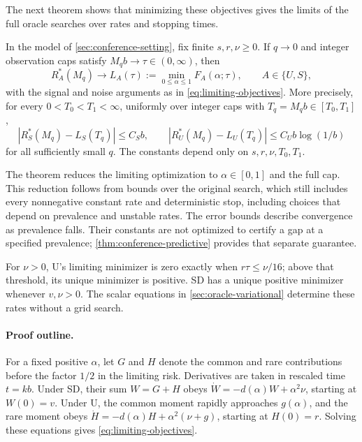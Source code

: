 \documentclass{alt2027}
\begin{document}
The next theorem shows that minimizing these objectives gives the limits of the
full oracle searches over rates and stopping times.

\begin{theorem}
  \label{thm:oracle-limits}
  In the model of \cref{sec:conference-setting}, fix finite $s,r,\nu \geq 0$. If
  $q \to 0$ and integer observation caps satisfy $M_qb \to \tau \in (0,\infty)$,
  then
  \[
    R_A^*(M_q)
    \longrightarrow L_A(\tau)
    :=              \min_{0 \leq \alpha \leq 1}F_A(\alpha;\tau), \qquad A
    \in             \{U,S\},
  \]
  with the signal and noise arguments as in \cref{eq:limiting-objectives}. More
  precisely, for every $0 < T_0 < T_1 < \infty$, uniformly over integer caps
  with $T_q = M_qb \in[T_0,T_1]$,
  \begin{equation}
    |R_S^*(M_q) - L_S(T_q)| \leq C_Sb,\qquad |R_U^*(M_q) - L_U(T_q)|
                            \leq C_Ub\log(1/b) \label{eq:oracle-limit-errors}
  \end{equation}
  for all sufficiently small $q$. The constants depend only on
  $s,r,\nu,T_0,T_1$.
\end{theorem}

The theorem reduces the limiting optimization to $\alpha \in[0,1]$ and the full
cap. This reduction follows from bounds over the original search, which still
includes every nonnegative constant rate and deterministic stop, including
choices that depend on prevalence and unstable rates. The error bounds describe
convergence as prevalence falls. Their constants are not optimized to certify a
gap at a specified prevalence; \cref{thm:conference-predictive} provides that
separate guarantee.

For $\nu > 0$, U's limiting minimizer is zero exactly when $r\tau \leq \nu/16$;
above that threshold, its unique minimizer is positive. SD has a unique positive
minimizer whenever $v,\nu > 0$. The scalar equations in
\cref{sec:oracle-variational} determine these rates without a grid search.

\paragraph{Proof outline.}

For a fixed positive $\alpha$, let $G$ and $H$ denote the common and rare
contributions before the factor $1/2$ in the limiting risk. Derivatives are
taken in rescaled time $t = kb$. Under SD, their sum $W = G + H$ obeys
$\dot W = -d(\alpha)W + \alpha^2\nu$, starting at $W(0) = v$. Under U, the
common moment rapidly approaches $g(\alpha)$, and the rare moment obeys
$\dot H = -d(\alpha)H + \alpha^2(\nu + g)$, starting at $H(0) = r$. Solving
these equations gives \cref{eq:limiting-objectives}.
\end{document}
